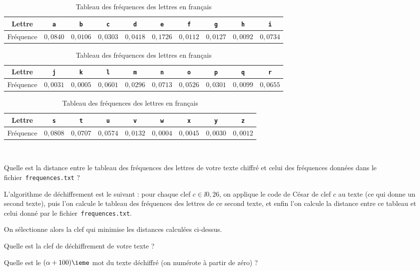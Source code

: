 \begin{table}[!h]
    \begin{center}
    \begin{tabular}{|c|c|c|c|c|c|c|c|c|c|}
        \hline
        Lettre & \texttt a & \texttt b & \texttt c & \texttt d & \texttt e & \texttt f & \texttt g & \texttt h & \texttt i \\
        \hline
        Fréquence & $0,0840$ & $0,0106$ & $0,0303$ & $0,0418$ & $0,1726$ & $0,0112$ & $0,0127$ & $0,0092$ & $0,0734$ \\
        \hline
    \end{tabular}
    
    \begin{tabular}{|c|c|c|c|c|c|c|c|c|c|}
        \hline
        Lettre & \texttt j & \texttt k & \texttt l & \texttt m & \texttt n & \texttt o & \texttt p & \texttt q & \texttt r \\
        \hline
        Fréquence & $0,0031$ & $0,0005$ & $0,0601$ & $0,0296$ & $0,0713$ & $0,0526$ & $0,0301$ & $0,0099$ & $0,0655$ \\
        \hline
    \end{tabular}
    
    \begin{tabular}{|c|c|c|c|c|c|c|c|c|}
        \hline
        Lettre & \texttt s & \texttt t & \texttt u & \texttt v & \texttt w & \texttt x & \texttt y & \texttt z   \\
        \hline
        Fréquence & $0,0808$ & $0,0707$ & $0,0574$ & $0,0132$ & $0,0004$ & $0,0045$ & $0,0030$ & $0,0012$  \\
        \hline
    \end{tabular}~~~~~~~~~~~~
    \caption{Tableau des fréquences des lettres en français}
    \label{FIC-008:table_frequences}
    \end{center}
\end{table}

\medskip{}

\question{} Quelle est la distance entre le tableau des fréquences des lettres de votre texte chiffré et celui des fréquences données dans le fichier~\texttt{frequences.txt} ? 

\pagebreak{}

L'algorithme de déchiffrement est le suivant : pour chaque clef $c \in \ii{0,26}$, on applique le code de César de clef $c$ au texte (ce qui donne un second texte), puis l'on calcule le tableau des fréquences des lettres de ce second texte, et enfin l'on calcule la distance entre ce tableau et celui donné par le fichier~\texttt{frequences.txt}. 

On sélectionne alors la clef qui minimise les distances calculées ci-dessus. 

\medskip{}

\question{} Quelle est la clef de déchiffrement de votre texte ? 

\medskip{}

\question{} Quelle est le $(\alpha+100)\ieme$ mot du texte déchiffré (on numérote à partir de zéro) ? 
